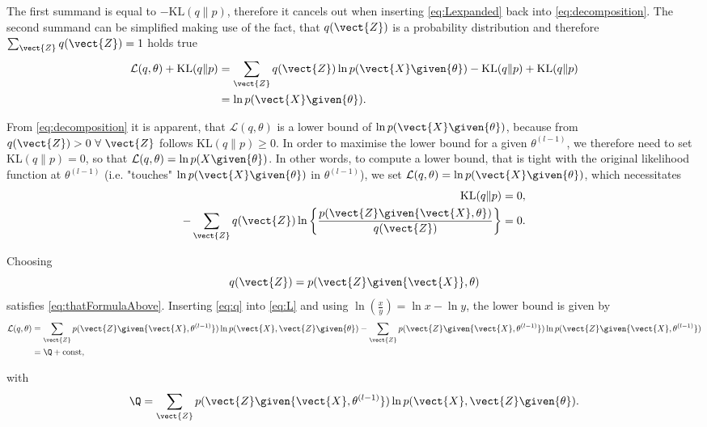 The first summand is equal to $-\text{KL}(q\|p)$, therefore it cancels out when inserting \eqref{eq:Lexpanded} back into \eqref{eq:decomposition}. The second summand can be simplified making use of the fact, that $q(\vect{Z})$ is a probability distribution and therefore $\sum_{\vect{Z}}q(\vect{Z})=1$ holds true
\begin{align}
    \mathcal{L}(q,\theta)+\text{KL}(q\|p)&=\sum_{\vect{Z}}q(\vect{Z})\ln p(\vect{X}\given{\theta})-\text{KL}(q\|p)+\text{KL}(q\|p)\\
    &=\ln p(\vect{X}\given{\theta}).
\end{align}

From \eqref{eq:decomposition} it is apparent, that $\mathcal{L}(q,\theta)$ is a lower bound of $\ln p(\vect{X}\given{\theta})$, because from $q(\vect{Z})>0\ \forall\ \vect{Z}$ follows KL$(q\|p)\geq0$. In order to maximise the lower bound for a given $\theta^{(l-1)}$, we therefore need to set KL$(q\|p)=0$, so that $\mathcal{L}(q,\theta)=\ln p(X\given{\theta})$. In other words, to compute a lower bound, that is tight with the original likelihood function at $\theta^{(l-1)}$ (i.e. "touches" $\ln p(\vect{X}\given{\theta})$ in $\theta^{(l-1)}$), we set $\mathcal{L}(q,\theta)=\ln p(\vect{X}\given{\theta})$, which necessitates
\begin{align}
\label{eq:thatOtherFormulaAbove}
    \text{KL}(q\|p)&=0,\\
    -\sum_{\vect{Z}}q(\vect{Z})\ln\left\{\frac{p(\vect{Z}\given{\vect{X},\theta})}{q(\vect{Z})} \right\}&=0.
\label{eq:thatFormulaAbove}
\end{align}

Choosing
\begin{equation}
    q(\vect{Z})=p(\vect{Z}\given{\vect{X}},\theta)
\label{eq:q}
\end{equation}
satisfies \eqref{eq:thatFormulaAbove}. Inserting \eqref{eq:q} into \eqref{eq:L} and using $\ln(\frac{x}{y})=\ln{x}-\ln{y}$, the lower bound is given by
\begin{align}
    \mathcal{L}(q, \theta)&=\sum_\vect{Z}p(\vect{Z}\given{\vect{X}, \theta^{(l-1)}})\ln p(\vect{X},\vect{Z}\given{\theta})-\sum_\vect{Z}p(\vect{Z}\given{\vect{X}, \theta^{(l-1)}})\ln p(\vect{Z}\given{\vect{X},\theta^{(l-1)}})\\
    &=\Q+\text{const},
\end{align}

with
\begin{equation}
\label{eq:e-step}
    \Q=\sum_\vect{Z}p(\vect{Z}\given{\vect{X}, \theta^{(l-1)}})\ln p(\vect{X},\vect{Z}\given{\theta}).
\end{equation}
    
